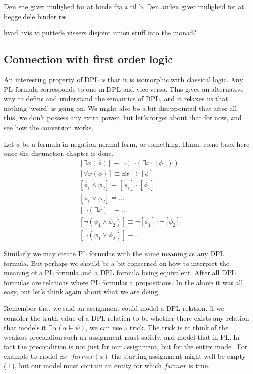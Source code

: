 \documentclass[12pt]{article}
\begin{document}
Den ene giver mulighed for at binde fra a til b. Den anden giver mulighed for at begge dele binder res

hvad hvis vi puttede vissers disjoint union stuff into the monad?

\subsection{Connection with first order logic}

An interesting property of DPL is that it is isomorphic with classical logic. Any PL formula corresponds to one in DPL and vice versa. This gives an alternative way to define and understand the semantics of DPL, and it relaxes us that nothing `weird' is going on. We might also be a bit disappointed that after all this, we don't possess any extra power, but let's forget about that for now, and see how the conversion works.

Let $\phi$ be a formula in negation normal form, or something. Hmm, come back here once the disjunction chapter is done.
\begin{align}
&[\exists x(\phi)] \equiv \neg(\neg(\exists x \cdot [\phi]))\\
&[\forall x(\phi)] \equiv \exists x \rightarrow [\phi]\\
&[\phi_1\wedge\phi_2] \equiv [\phi_1]\cdot[\phi_2]\\
&[\phi_1\vee\phi_2] \equiv \dots\\
&[\neg(\exists x)] \equiv \dots\\
&[\neg(\phi_1\wedge\phi_2)] \equiv \neg[\phi_1]\cdot\neg[\phi_2]\\
&[\neg(\phi_1\vee\phi_2)] \equiv \dots
\end{align}

Similarly we may create PL formulas with the same meaning as any DPL formula. But perhaps we should be a bit conserned on how to interpret the meaning of a PL formula and a DPL formula being equivalent. After all DPL formulas are relations where PL formulas a propositions. In the above it was all easy, but let's think again about what we are doing.

Remember that we said an assignment could model a DPL relation. If we consider the truth value of a DPL relation to be whether there exists any relation that models it $\exists\alpha(\alpha\models\psi)$, we can use a trick. The trick is to think of the weakest precondion such an assignment must satisfy, and model that in PL. In fact the precondition is not just for our assignment, but for the entire model. For example to model $\exists x\cdot farmer(x)$ the starting assignment might well be empty ($\bot$), but our model must contain an entity for which $farmer$ is true.
\end{document}
